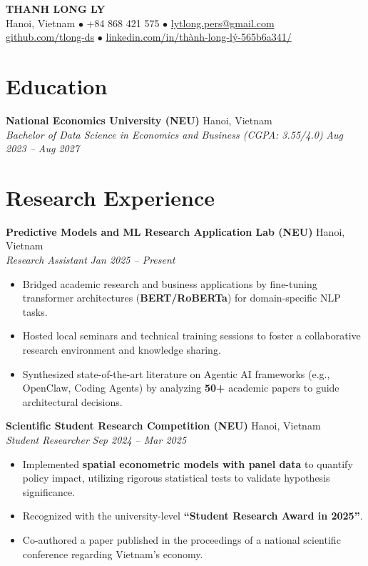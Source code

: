 \documentclass[10pt, letterpaper]{article}
\newcommand{\entryheader}[4]{
    \noindent\textbf{#1} \hfill #2 \\
    \textit{#3} \hfill \textit{#4} \par
}
\begin{document}
\pagestyle{empty}

\begin{center}
    {\LARGE \textbf{THANH LONG LY}} \\
    \vspace{4pt}
    Hanoi, Vietnam $\bullet$ +84 868 421 575 $\bullet$ \href{mailto:lytlong.pers@gmail.com}{lytlong.pers@gmail.com} \\
    \href{https://github.com/tlong-ds}{github.com/tlong-ds} $\bullet$ \href{https://www.linkedin.com/in/thành-long-lý-565b6a341/}{linkedin.com/in/thành-long-lý-565b6a341/}
\end{center}

\section{Education}
\entryheader{National Economics University (NEU)}{Hanoi, Vietnam}{Bachelor of Data Science in Economics and Business (CGPA: 3.55/4.0)}{Aug 2023 -- Aug 2027}

\section{Research Experience}
\entryheader{Predictive Models and ML Research Application Lab (NEU)}{Hanoi, Vietnam}{Research Assistant}{Jan 2025 -- Present}
\begin{itemize}
    \item Bridged academic research and business applications by fine-tuning transformer architectures (\textbf{BERT/RoBERTa}) for domain-specific NLP tasks.
    \item Hosted local seminars and technical training sessions to foster a collaborative research environment and knowledge sharing.
    \item Synthesized state-of-the-art literature on Agentic AI frameworks (e.g., OpenClaw, Coding Agents) by analyzing \textbf{50+} academic papers to guide architectural decisions.
\end{itemize}

\vspace{6pt}
\entryheader{Scientific Student Research Competition (NEU)}{Hanoi, Vietnam}{Student Researcher}{Sep 2024 -- Mar 2025}
\begin{itemize}
    \item Implemented \textbf{spatial econometric models with panel data} to quantify policy impact, utilizing rigorous statistical tests to validate hypothesis significance.
    \item Recognized with the university-level \textbf{``Student Research Award in 2025''}.
    \item Co-authored a paper published in the proceedings of a national scientific conference regarding Vietnam's economy.
\end{itemize}
\end{document}
